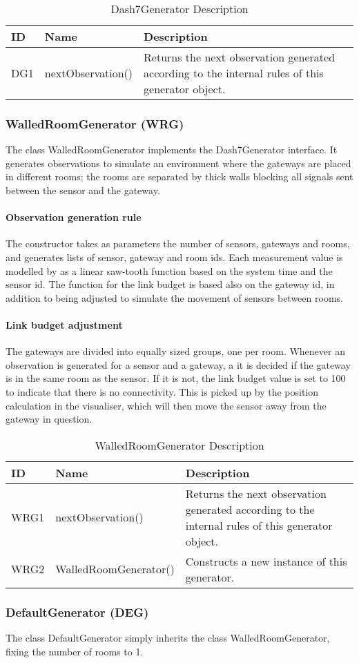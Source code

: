 \documentclass[../document]{subfiles}
\begin{document}
\begin{table}[H]
\caption{Dash7Generator Description}
\centering
\begin{tabularx}{\textwidth}{|l|l|X|}
\hline ID
&Name
&Description
\\ \hline 
DG1
&nextObservation()
&Returns the next observation generated according to the internal rules of this generator object.
\\ \hline 
\end{tabularx}
\end{table}

\subsubsection{WalledRoomGenerator (WRG)}
The class WalledRoomGenerator implements the Dash7Generator interface. It generates observations to simulate an environment where the gateways are placed in different rooms; the rooms are separated by thick walls blocking all signals sent between the sensor and the gateway.

\paragraph{Observation generation rule}
The constructor takes as parameters the number of sensors, gateways and rooms, and generates lists of sensor, gateway and room ids. Each measurement value is modelled by as a linear saw-tooth function based on the system time and the sensor id. The function for the link budget is based also on the gateway id, in addition to being adjusted to simulate the movement of sensors between rooms.

\paragraph{Link budget adjustment}
The gateways are divided into equally sized groups, one per room. Whenever an observation is generated for a sensor and a gateway, a it is decided if the gateway is in the same room as the sensor. If it is not, the link budget value is set to 100 to indicate that there is no connectivity. This is picked up by the position calculation in the visualiser, which will then move the sensor away from the gateway in question.

\begin{table}[H]
\caption{WalledRoomGenerator Description}
\centering
\begin{tabularx}{\textwidth}{|l|l|X|}
\hline ID
&Name
&Description
\\ \hline 
WRG1
&nextObservation()
&Returns the next observation generated according to the internal rules of this generator object.
\\ \hline WRG2
&WalledRoomGenerator()
&Constructs a new instance of this generator.
\\ \hline 
\end{tabularx}
\end{table}

\subsubsection{DefaultGenerator (DEG)}
The class DefaultGenerator simply inherits the class WalledRoomGenerator, fixing the number of rooms to 1.
\end{document}

